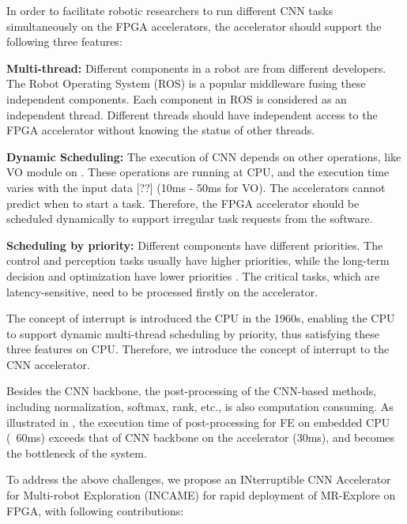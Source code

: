 In order to facilitate robotic researchers to run different CNN tasks simultaneously on the FPGA accelerators, the accelerator should support the following three features:

\textbf{Multi-thread:} Different components in a robot are from different developers. The Robot Operating System (ROS) \cite{quigley2009ros} is a popular middleware fusing these independent components. Each component in ROS is considered as an independent thread. Different threads should have independent access to the FPGA accelerator without knowing the status of other threads.



\textbf{Dynamic Scheduling:} The execution of CNN depends on other operations, like VO module on . 
These operations are running at CPU, and the execution time varies with the input data [??] (10ms - 50ms for VO). 
The accelerators cannot predict when to start a task. 
Therefore, the FPGA accelerator should be scheduled dynamically to support irregular task requests from the software.

\textbf{Scheduling by priority:} Different components have different priorities. The control and perception tasks usually have higher priorities, while the long-term decision and optimization have lower priorities \cite{RamsauerKLM17}. The critical tasks, which are latency-sensitive,  need to be processed firstly on the accelerator.

The concept of interrupt \cite{jen1974processor} is introduced the CPU in the 1960s, enabling the CPU to support dynamic multi-thread scheduling by priority, thus satisfying these three features on CPU. Therefore, we introduce the concept of interrupt to the CNN accelerator.

Besides the CNN backbone, the post-processing of the CNN-based methods, including normalization, softmax, rank, etc., is also computation consuming. As illustrated in , the execution time of post-processing for FE on embedded CPU (~60ms) exceeds that of CNN backbone on the accelerator (30ms), and becomes the bottleneck of the system.

To address the above challenges, we propose an INterruptible CNN Accelerator for Multi-robot Exploration (INCAME) for rapid deployment of MR-Explore on FPGA, with following contributions:

